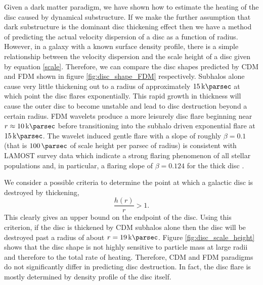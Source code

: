 \documentclass[usenatbib]{mnras}
\begin{document}
Given a dark matter paradigm, we have shown how to estimate the heating of the disc caused by dynamical substructure. If we make the further assumption that dark substructure is the dominant disc thickening effect then we have a method of predicting the actual velocity dispersion of a disc as a function of radius. However, in a galaxy with a known surface density profile, there is a simple relationship between the velocity dispersion and the scale height of a disc given by equation \eqref{scale}. Therefore, we can compare the disc shapes predicted by CDM and FDM shown in figure \ref{fig:disc_shape_FDM} respectively. Subhalos alone cause very little thickening out to a radius of approximately $\SI{15}{\kilo \parsec}$ at which point the disc flares exponentially. This rapid growth in thickness will cause the outer disc to become unstable and lead to disc destruction beyond a certain radius. FDM wavelets produce a more leisurely disc flare beginning near $r \approx \SI{10}{\kilo \parsec}$ before transitioning into the subhalo driven exponential flare at $\SI{15}{\kilo \parsec}$. The wavelet induced gentle flare with a slope of roughly $\beta = 0.1$ (that is $\SI{100}{\parsec}$ of scale height per parsec of radius) is consistent with LAMOST survey data which indicate a strong flaring phenomenon of all stellar populations and, in particular, a flaring slope of $\beta = 0.124$ for the thick disc \citep{LAMOST}. 
\par 
We consider a possible criteria to determine the point at which a galactic disc is destroyed by thickening,
\begin{equation}
\frac{h(r)}{r} > 1.
\end{equation}
This clearly gives an upper bound on the endpoint of the disc. Using this criterion, if the disc is thickened by CDM subhalos alone then the disc will be destroyed past a radius of about $r = \SI{19}{\kilo \parsec}$. Figure \ref{fig:disc_scale_height} shows that the disc shape is not highly sensitive to particle mass at large radii and therefore to the total rate of heating. Therefore, CDM and FDM paradigms do not significantly differ in predicting disc destruction. In fact, the disc flare is mostly determined by density profile of the disc itself.  
\par
\end{document}
